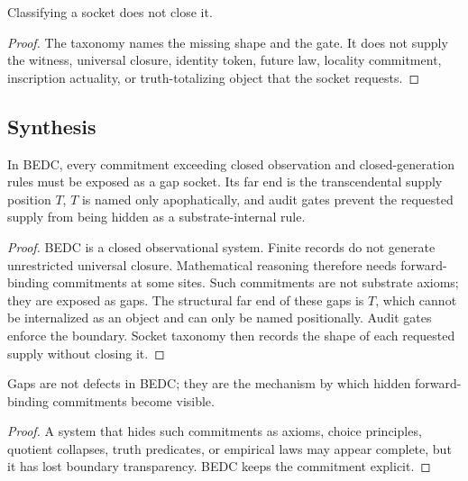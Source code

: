 \begin{corollary}
\label{cor:philosophy-taxonomy-does-not-discharge}
Classifying a socket does not close it.
\end{corollary}
\begin{proof}
The taxonomy names the missing shape and the gate. It does not supply
the witness, universal closure, identity token, future law, locality
commitment, inscription actuality, or truth-totalizing object that the
socket requests.
\end{proof}

\subsection{Synthesis}
\label{subsec:philosophy-gap-t-boundary-synthesis}

\begin{theorem}
\label{thm:philosophy-gap-t-boundary-synthesis}
In BEDC, every commitment exceeding closed observation and
closed-generation rules must be exposed as a gap socket. Its far end is
the transcendental supply position \(T\), \(T\) is named only
apophatically, and audit gates prevent the requested supply from being
hidden as a substrate-internal rule.
\end{theorem}
\begin{proof}
BEDC is a closed observational system. Finite records do not generate
unrestricted universal closure. Mathematical reasoning therefore needs
forward-binding commitments at some sites. Such commitments are not
substrate axioms; they are exposed as gaps. The structural far end of
these gaps is \(T\), which cannot be internalized as an object and can
only be named positionally. Audit gates enforce the boundary. Socket
taxonomy then records the shape of each requested supply without
closing it.
\end{proof}

\begin{corollary}
\label{cor:philosophy-gaps-not-weakness}
Gaps are not defects in BEDC; they are the mechanism by which hidden
forward-binding commitments become visible.
\end{corollary}
\begin{proof}
A system that hides such commitments as axioms, choice principles,
quotient collapses, truth predicates, or empirical laws may appear
complete, but it has lost boundary transparency. BEDC keeps the
commitment explicit.
\end{proof}

